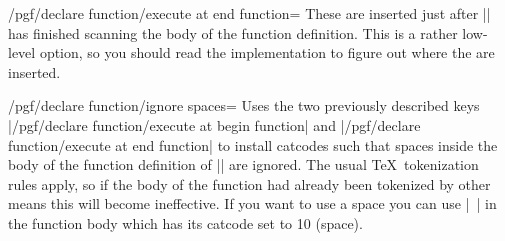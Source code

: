 \begin{key}{/pgf/declare function/execute at end function=}
    These  are inserted just after |\pgfmathdeclarefunction| has
    finished scanning the body of the function definition.  This is a rather
    low-level option, so you should read the implementation to figure out where
    the  are inserted.
\end{key}

\begin{key}{/pgf/declare function/ignore spaces=}
    Uses the two previously described keys |/pgf/declare function/execute at begin function| and
    |/pgf/declare function/execute at end function| to install catcodes such
    that spaces inside the body of the function definition of
    |\pgfmathdeclarefunction| are ignored.  The usual \TeX\ tokenization rules
    apply, so if the body of the function had already been tokenized by other
    means this will become ineffective.  If you want to use a space you can use
    |~| in the function body which has its catcode set to 10 (space).
\end{key}
